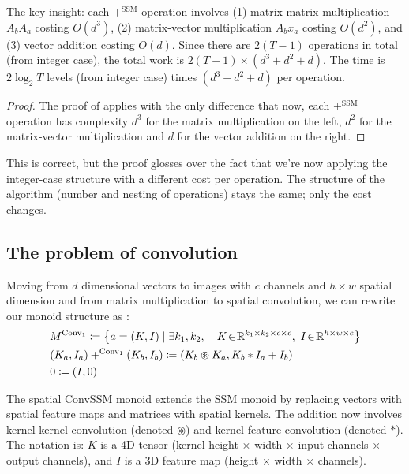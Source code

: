 \begin{ThomasAnnotation}
The key insight: each $+^{\mathrm{SSM}}$ operation involves (1) matrix-matrix multiplication $A_b A_a$ costing $O(d^3)$, (2) matrix-vector multiplication $A_b x_a$ costing $O(d^2)$, and (3) vector addition costing $O(d)$. Since there are $2(T-1)$ operations in total (from integer case), the total work is $2(T-1) \times (d^3 + d^2 + d)$. The time is $2 \log_2 T$ levels (from integer case) times $(d^3 + d^2 + d)$ per operation.
\end{ThomasAnnotation}

\begin{proof}
The proof of  applies with the only difference that now, each $+^{\mathrm{SSM}}$ operation has complexity $d^3$ for the matrix multiplication on the left, $d^2$ for the matrix-vector multiplication and $d$ for the vector addition on the right.
\end{proof}

\begin{ThomasAnnotation}
This is correct, but the proof glosses over the fact that we're now applying the integer-case structure with a different cost per operation. The structure of the algorithm (number and nesting of operations) stays the same; only the cost changes.
\end{ThomasAnnotation}

\subsection{The problem of convolution}
\label{sec:spatial_ConvSSM}

Moving from $d$ dimensional vectors to images with $c$ channels and $h \times w$ spatial dimension and from matrix multiplication to spatial convolution, we can rewrite our monoid structure as :
\begin{align}
    &M^{\mathrm{Conv}_1}\coloneqq \left\{a = (K, I)\mid \exists k_1, k_2,\quad K\!\in\!\mathbb{R}^{k_1\times k_2\times c\times c},~I\!\in\!\mathbb{R}^{h \times w \times c}\right\}\\
    &(K_a, I_a) +^{\mathrm{Conv}_1} (K_b,I_b)\coloneqq (K_b \circledast K_a, K_b \ast I_a + I_b)\\
    &0\coloneqq(I, 0)
\end{align}

\begin{ThomasAnnotation}
The spatial ConvSSM monoid extends the SSM monoid by replacing vectors with spatial feature maps and matrices with spatial kernels. The addition now involves kernel-kernel convolution (denoted $\circledast$) and kernel-feature convolution (denoted $\ast$). The notation is: $K$ is a 4D tensor (kernel height $\times$ width $\times$ input channels $\times$ output channels), and $I$ is a 3D feature map (height $\times$ width $\times$ channels).
\end{ThomasAnnotation}

